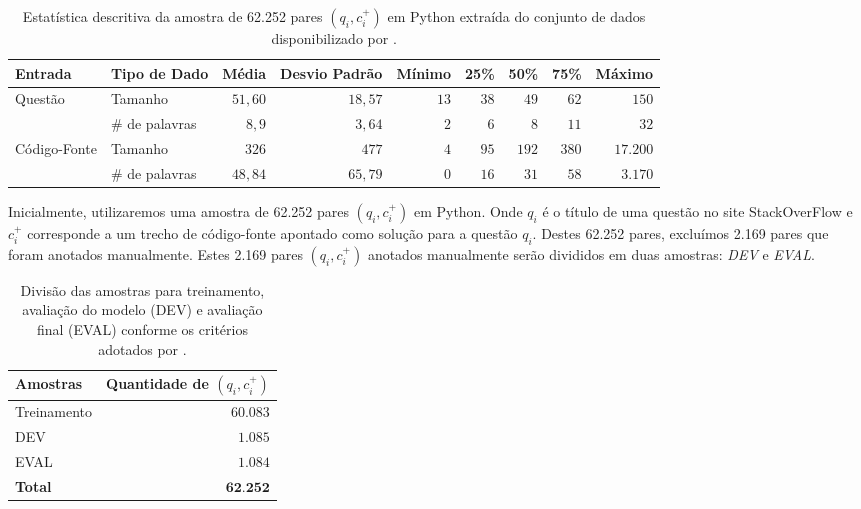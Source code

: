 \documentclass[12pt]{article}
\begin{document}
\begin{table}[h]
\centering
\begin{tabular}{ l l r r r r r r r  }
\hline
\textbf{Entrada} & \textbf{Tipo de Dado} & \textbf{Média}
& \textbf{Desvio Padrão} & \textbf{Mínimo} & \textbf{25\%} & \textbf{50\%} & \textbf{75\%} & \textbf{Máximo}\\
\hline
\multirow{2}{4em}{Questão} & Tamanho & $51,60$ & $18,57$ &
$13$ & $38$ & $49$ & $62$ & $150$\\
 
 & \# de palavras & $8,9$ & $3,64$ & $2$ & $6$
 & $8$ & $11$ & $32$\\
 
 \multirow{2}{4em}{Código-Fonte} & Tamanho & $326$ & $477$ &
 $4$ & $95$ & $192$ & $380$ & $17.200$\\
 
 & \# de palavras & $48,84$ & $65,79$ & $0$ & $16$
 & $31$ & $58$ & $3.170$ \\
 
 \hline
\end{tabular}
\caption{Estatística descritiva da amostra de 62.252 pares $(q_{i}, c_{i}^{+})$ em Python extraída do conjunto de dados disponibilizado por \cite{Yao-staqc:2018}.}
\label{table:divisao-amostras}
\end{table}


Inicialmente, utilizaremos uma amostra de 62.252 pares $(q_{i}, c_{i}^{+})$ em Python. Onde $q_{i}$ é o título de uma questão no site StackOverFlow e $c_{i}^{+}$ corresponde a um trecho de código-fonte apontado como solução para a questão $q_{i}$. Destes 62.252 pares, excluímos 2.169 pares que foram anotados manualmente. Estes 2.169 pares $(q_{i}, c_{i}^{+})$ anotados manualmente serão divididos em duas amostras: \emph{DEV} e \emph{EVAL}.


\begin{table}[h]
\centering
\begin{tabular}{ p{3cm} r  }
 \hline
 \textbf{Amostras} & \textbf{Quantidade de $(q_{i}, c_{i}^{+})$}\\
 \hline
 Treinamento & $60.083$\\
 
 DEV & $1.085$ \\
 
 EVAL & $1.084$\\
 \hline
 \textbf{Total} & $\textbf{62.252}$\\
 \hline
\end{tabular}
\caption{Divisão das amostras para treinamento, avaliação do modelo (DEV) e avaliação final (EVAL) conforme os critérios adotados por \cite{iyer-etal-2016-summarizing}.}
\label{table:divisao-amostras}
\end{table}
\end{document}
